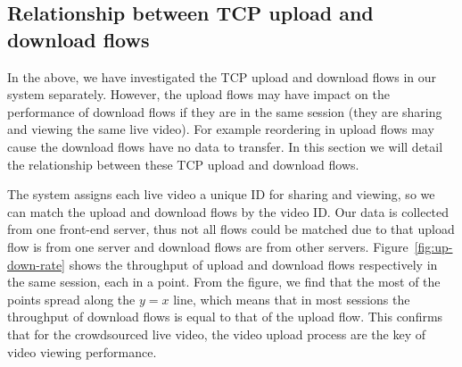 


\subsection{Relationship between TCP upload and download flows}
\label{sub:relationship-analysis}
In the above, we have investigated the TCP upload and download flows in our system separately. However, the upload flows may have impact on the performance of download flows if they are in the same session (\ie they are sharing and viewing the same live video). For example reordering in upload flows may cause the download flows have no data to transfer. In this section we will detail the relationship between these TCP upload and download flows.

The system assigns each live video a unique ID for sharing and viewing, so we can match the upload and download flows by the video ID. Our data is collected from one front-end server, thus not all flows could be matched due to that upload flow is from one server and download flows are from other servers. Figure~\ref{fig:up-down-rate} shows the throughput of upload and download flows respectively in the same session, each in a point. From the figure, we find that the most of the points spread along the $y = x$ line, which means that in most sessions the throughput of download flows is equal to that of the upload flow. This confirms that for the crowdsourced live video, the video upload process are the key of video viewing performance.


